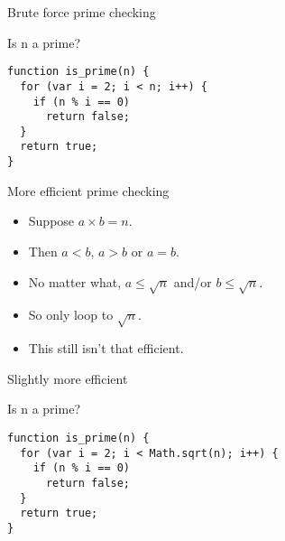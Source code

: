\begin{frame}[fragile]{Brute force prime checking}
  \begin{alertblock}{Is n a prime?}
    \begin{verbatim}
function is_prime(n) {
  for (var i = 2; i < n; i++) {
    if (n % i == 0)
      return false;
  }
  return true;
}
    \end{verbatim}
  \end{alertblock}
\end{frame}

\begin{frame}[fragile]{More efficient prime checking}
  \begin{itemize}
    \item Suppose $a \times b = n$.
    \item Then $a < b$, $a > b$ or $a = b$.
    \item No matter what, $a \le \sqrt{n}$ and/or $b \le \sqrt{n}$.
    \item So only loop to $\sqrt{n}$.
    \item This still isn't that efficient.
  \end{itemize}
\end{frame}

\begin{frame}[fragile]{Slightly more efficient}
  \begin{alertblock}{Is n a prime?}
    \begin{verbatim}
function is_prime(n) {
  for (var i = 2; i < Math.sqrt(n); i++) {
    if (n % i == 0)
      return false;
  }
  return true;
}
    \end{verbatim}
  \end{alertblock}
\end{frame}

